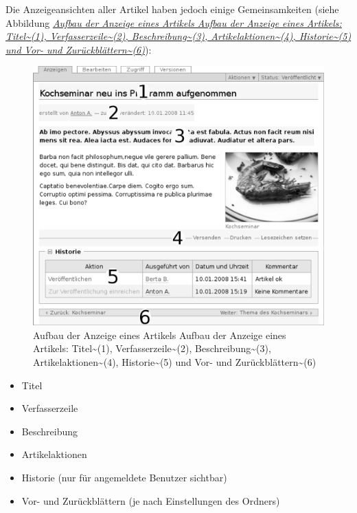 \documentclass[a4paper,12pt,ngerman]{manual}
\begin{document}
Die Anzeigeansichten aller Artikel haben jedoch einige Gemeinsamkeiten (siehe
Abbildung \hyperlink{fig-gemeinsamkeiten-anzeige}{\emph{Aufbau der Anzeige eines Artikels Aufbau der Anzeige eines Artikels: Titel\textasciitilde{}(1), Verfasserzeile\textasciitilde{}(2), Beschreibung\textasciitilde{}(3), Artikelaktionen\textasciitilde{}(4), Historie\textasciitilde{}(5) und Vor- und Zurückblättern\textasciitilde{}(6)}}):
\hypertarget{fig-gemeinsamkeiten-anzeige}{}\begin{figure}[htbp]
\centering

\includegraphics{gemeinsamkeiten-anzeige.png}
\caption{Aufbau der Anzeige eines Artikels Aufbau der Anzeige eines Artikels: Titel\textasciitilde{}(1), Verfasserzeile\textasciitilde{}(2), Beschreibung\textasciitilde{}(3), Artikelaktionen\textasciitilde{}(4), Historie\textasciitilde{}(5) und Vor- und Zurückblättern\textasciitilde{}(6)}\end{figure}
\begin{itemize}
\item {} 
Titel

\item {} 
Verfasserzeile

\item {} 
Beschreibung

\item {} 
Artikelaktionen

\item {} 
Historie (nur für angemeldete Benutzer sichtbar)

\item {} 
Vor- und Zurückblättern (je nach Einstellungen des Ordners)

\end{itemize}
\end{document}
